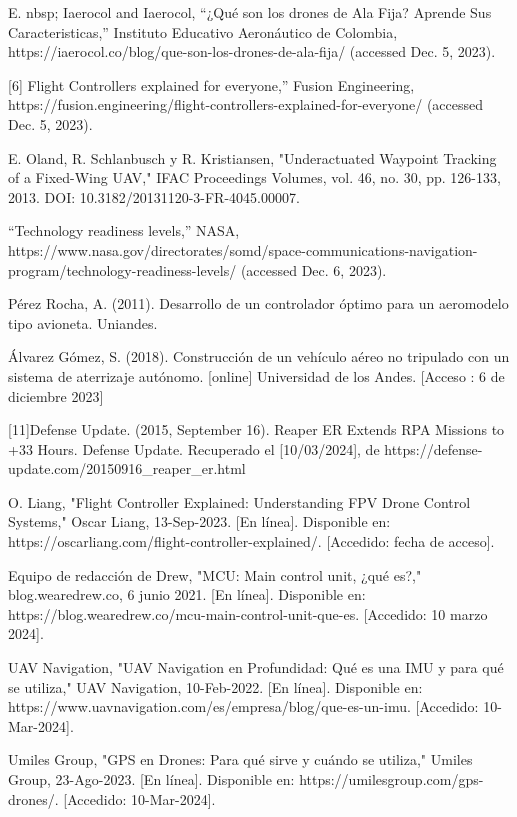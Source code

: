 \begin{thebibliography}{20}
    
     E. nbsp; 	Iaerocol and Iaerocol, “¿Qué son los drones de Ala Fija? Aprende Sus Caracteristicas,” Instituto Educativo Aeronáutico de Colombia, https://iaerocol.co/blog/que-son-los-drones-de-ala-fija/ (accessed Dec. 5, 2023). 
    
    [6] Flight Controllers explained for everyone,” Fusion Engineering, https://fusion.engineering/flight-controllers-explained-for-everyone/ (accessed Dec. 5, 2023). 
        
     E. Oland, R. Schlanbusch y R. Kristiansen, "Underactuated Waypoint Tracking of a Fixed-Wing UAV," IFAC Proceedings Volumes, vol. 46, no. 30, pp. 126-133, 2013. DOI: 10.3182/20131120-3-FR-4045.00007.
    
    
    “Technology readiness levels,” NASA, https://www.nasa.gov/directorates/somd/space-communications-navigation-program/technology-readiness-levels/ (accessed Dec. 6, 2023). 
    
     Pérez Rocha, A.  (2011). Desarrollo de un controlador óptimo para un aeromodelo tipo avioneta. Uniandes. 
       
    Álvarez Gómez, S.  (2018). Construcción de un vehículo aéreo no tripulado con un sistema de aterrizaje autónomo. [online]  Universidad de los Andes.  [Acceso : 6 de diciembre 2023]
    
    [11]Defense Update. (2015, September 16). Reaper ER Extends RPA Missions to +33 Hours. Defense Update. Recuperado el [10/03/2024], de https://defense-update.com/20150916\_reaper\_er.html
    
     O. Liang, "Flight Controller Explained: Understanding FPV Drone Control Systems," Oscar Liang, 13-Sep-2023. [En línea]. Disponible en: https://oscarliang.com/flight-controller-explained/. [Accedido: fecha de acceso].
    
    Equipo de redacción de Drew, "MCU: Main control unit, ¿qué es?," blog.wearedrew.co, 6 junio 2021. [En línea]. Disponible en: https://blog.wearedrew.co/mcu-main-control-unit-que-es. [Accedido: 10 marzo 2024].
    
    UAV Navigation, "UAV Navigation en Profundidad: Qué es una IMU y para qué se utiliza," UAV Navigation, 10-Feb-2022. [En línea]. Disponible en: https://www.uavnavigation.com/es/empresa/blog/que-es-un-imu. [Accedido: 10-Mar-2024].
    
    Umiles Group, "GPS en Drones: Para qué sirve y cuándo se utiliza," Umiles Group, 23-Ago-2023. [En línea]. Disponible en: https://umilesgroup.com/gps-drones/. [Accedido: 10-Mar-2024].
    

\end{thebibliography}
